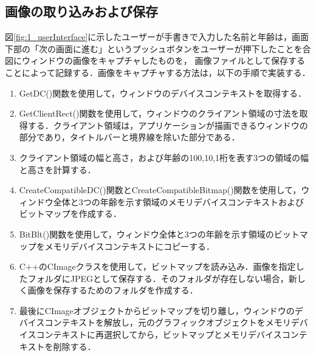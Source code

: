 \subsection{画像の取り込みおよび保存}
図\ref{fig:1_userInterface}に示したユーザーが手書きで入力した名前と年齢は，画面下部の「次の画面に進む」というプッシュボタンをユーザーが押下したことを合図にウィンドウの画像をキャプチャしたものを，
画像ファイルとして保存することによって記録する．画像をキャプチャする方法は，以下の手順で実装する．
\begin{enumerate}[leftmargin=*]
  \item GetDC()関数を使用して，ウィンドウのデバイスコンテキストを取得する．
  \item GetClientRect()関数を使用して，ウィンドウのクライアント領域の寸法を取得する．クライアント領域は，アプリケーションが描画できるウィンドウの部分であり，タイトルバーと境界線を除いた部分である．
  \item クライアント領域の幅と高さ，および年齢の100,10,1桁を表す3つの領域の幅と高さを計算する．
  \item CreateCompatibleDC()関数とCreateCompatibleBitmap()関数を使用して，ウィンドウ全体と3つの年齢を示す領域のメモリデバイスコンテキストおよびビットマップを作成する．
  \item BitBlt()関数を使用して，ウィンドウ全体と3つの年齢を示す領域のビットマップをメモリデバイスコンテキストにコピーする．
  \item C++のCImageクラスを使用して，ビットマップを読み込み．画像を指定したフォルダにJPEGとして保存する．そのフォルダが存在しない場合，新しく画像を保存するためのフォルダを作成する．
  \item 最後にCImageオブジェクトからビットマップを切り離し，ウィンドウのデバイスコンテキストを解放し，元のグラフィックオブジェクトをメモリデバイスコンテキストに再選択してから，ビットマップとメモリデバイスコンテキストを削除する．

\end{enumerate}
